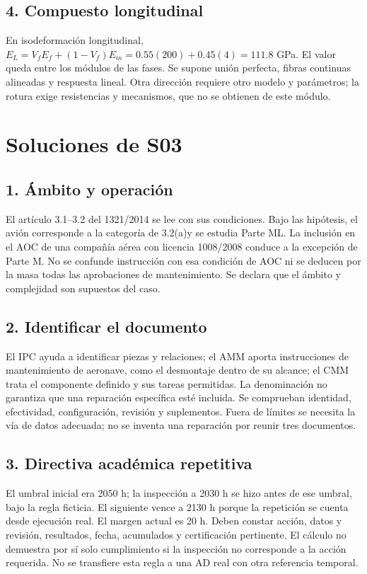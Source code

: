 
\section{4. Compuesto longitudinal}
En isodeformación longitudinal,$E_L=V_fE_f+(1-V_f)E_m=0.55(200)+0.45(4)=111.8$ GPa. El valor queda entre los módulos de las fases. Se supone unión perfecta, fibras continuas alineadas y respuesta lineal. Otra dirección requiere otro modelo y parámetros; la rotura exige resistencias y mecanismos, que no se obtienen de este módulo.

\chapter{Soluciones de S03}


\section{1. Ámbito y operación}
El artículo 3.1--3.2 del 1321/2014 se lee con sus condiciones. Bajo las hipótesis, el avión corresponde a la categoría de 3.2(a)y se estudia Parte ML. La inclusión en el AOC de una compañía aérea con licencia 1008/2008 conduce a la excepción de Parte M. No se confunde instrucción con esa condición de AOC ni se deducen por la masa todas las aprobaciones de mantenimiento. Se declara que el ámbito y complejidad son supuestos del caso.

\section{2. Identificar el documento}
El IPC ayuda a identificar piezas y relaciones; el AMM aporta instrucciones de mantenimiento de aeronave, como el desmontaje dentro de su alcance; el CMM trata el componente definido y sus tareas permitidas. La denominación no garantiza que una reparación específica esté incluida. Se comprueban identidad, efectividad, configuración, revisión y suplementos. Fuera de límites se necesita la vía de datos adecuada; no se inventa una reparación por reunir tres documentos.

\section{3. Directiva académica repetitiva}
El umbral inicial era 2050 h; la inspección a 2030 h se hizo antes de ese umbral, bajo la regla ficticia. El siguiente vence a 2130 h porque la repetición se cuenta desde ejecución real. El margen actual es 20 h. Deben constar acción, datos y revisión, resultados, fecha, acumulados y certificación pertinente. El cálculo no demuestra por sí solo cumplimiento si la inspección no corresponde a la acción requerida. No se transfiere esta regla a una AD real con otra referencia temporal.


